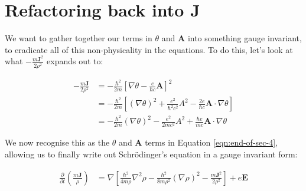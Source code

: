 
\section{Refactoring back into $\mathbf{J}$}
\label{sec:refactoring}

We want to gather together our terms in $\theta$ and $\mathbf{A}$ into something
gauge invariant, to eradicate all of this non-physicality in the equations. To
do this, let's look at what $-\frac{m \mathbf{J}^2}{2\rho^2}$ expands out to:

\begin{align}
    - \frac{m \mathbf{J}}{2 \rho^2}
    &=- \frac{\hbar^2}{2m} \left[ \nabla \theta
      - \frac{e}{\hbar c} \mathbf{A} \right]^2
        \\
    &=- \frac{\hbar^2}{2m} \left[ \left( \nabla \theta \right)^2
      + \frac{e^2}{\hbar^2 c^2} A^2
      - \frac{2e}{\hbar c}\mathbf{A} \cdot \nabla \theta \right]
        \\
    &=- \frac{\hbar^2}{2m} \left( \nabla \theta \right)^2
      - \frac{e^2}{2mc^2} A^2
      + \frac{\hbar e}{mc} \mathbf{A} \cdot \nabla \theta
\end{align}

We now recognise this as the $\theta$ and $\mathbf{A}$ terms in Equation
\ref{eqn:end-of-sec-4}, allowing us to finally write out Schr\"odinger's
equation in a gauge invariant form:

\begin{align}
    \frac{\partial}{\partial t} \left( \frac{m \mathbf{J}}{\rho} \right)
        &= \nabla \left[
           \frac{\hbar^2}{4m \rho} \nabla^2 \rho
         - \frac{\hbar^2}{8m \rho^2} \left( \nabla \rho \right)^2
         - \frac{m \mathbf{J}^2}{2\rho^2} \right]
         + e \mathbf{E}
\end{align}
